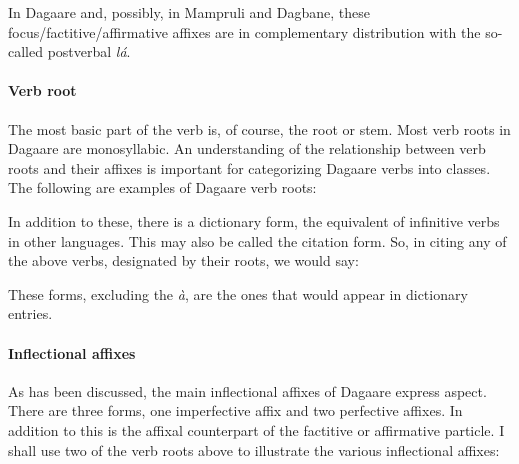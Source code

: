 In Dagaare and, possibly, in Mampruli and Dagbane, these focus/factitive/affirmative affixes
are in complementary distribution with the so-called postverbal \textit{lá}.

\paragraph{Verb root}

The most basic part of the verb is, of course, the root or stem. Most verb roots in
Dagaare are monosyllabic. An understanding of the relationship between verb roots and their
affixes is important for categorizing Dagaare verbs into classes. The following are examples
of Dagaare verb roots:



In addition to these, there is a dictionary form, the equivalent of infinitive verbs in other
languages. This may also be called  the citation form. So, in citing any of the above
verbs, designated by their roots, we would say:



These forms, excluding the \textit{à}, are the ones that would appear in dictionary entries.

\paragraph{Inflectional affixes}
As has been discussed, the main inflectional affixes of Dagaare express aspect.
There are three forms, one imperfective affix and two perfective
affixes. In addition to this is the affixal counterpart of the factitive or affirmative particle. I
shall use two of the verb roots above to illustrate the various inflectional affixes:

